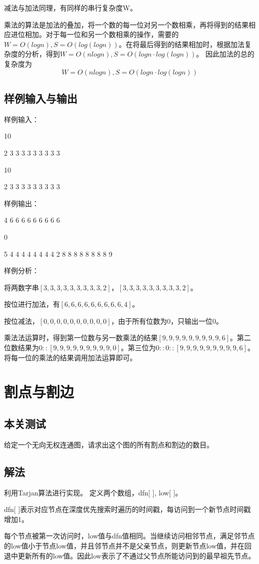 \documentclass[UTF8,a4paperdui, %
]{ctexart}
\begin{document}
减法与加法同理，有同样的串行复杂度W。

乘法的算法是加法的叠加，将一个数的每一位对另一个数相乘，再将得到的结果相应进位相加。对于每一位和另一个数相乘的操作，需要的$W=O(logn),S=O(log(logn))$。在将最后得到的结果相加时，根据加法复杂度的分析，得到$W=O(nlogn),S=O(logn\cdot log(logn))$。
因此加法的总的复杂度为
\[
W=O(nlogn),S=O(logn\cdot log(logn))
\]
\subsection{样例输入与输出}
样例输入：

10

2 3 3 3 3 3 3 3 3 3 
 
10 

2 3 3 3 3 3 3 3 3 3

样例输出：

4 6 6 6 6 6 6 6 6 6 

0 

5 4 4 4 4 4 4 4 4 2 8 8 8 8 8 8 8 8 9 

样例分析：

将两数字串$[3,3,3,3,3,3,3,3,3,2]$，$[3,3,3,3,3,3,3,3,3,2]$。

按位进行加法，有$[6,6,6,6,6,6,6,6,6,4]$。

按位减法，$[0,0,0,0,0,0,0,0,0,0]$，由于所有位数为0，只输出一位0。

乘法法运算时，得到第一位数与另一数乘法的结果$[9,9,9,9,9,9,9,9,9,6]$。第二位数结果为$0::[9,9,9,9,9,9,9,9,9,0]$。第三位为$0::0::[9,9,9,9,9,9,9,9,9,6]$。将每一位的乘法的结果调用加法运算即可。
\section{割点与割边}
\subsection{本关测试}
给定一个无向无权连通图，请求出这个图的所有割点和割边的数目。
\subsection{解法}
利用Tarjan算法进行实现。
定义两个数组，dfn[ ], low[ ]。

dfn[ ]表示对应节点在深度优先搜索时遍历的时间戳，每访问到一个新节点时间戳增加1。

每个节点被第一次访问时，low值与dfn值相同。当继续访问相邻节点，满足邻节点的low值小于节点low值，并且邻节点并不是父亲节点，则更新节点low值，并在回退中更新所有的low值。因此low表示了不通过父节点所能访问到的最早祖先节点。
\end{document}
